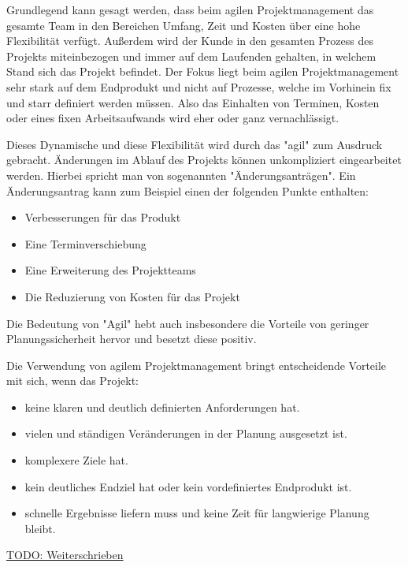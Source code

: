 

Grundlegend kann gesagt werden, dass beim agilen Projektmanagement das gesamte Team in den Bereichen Umfang, Zeit und Kosten über eine hohe Flexibilität verfügt. Außerdem wird der Kunde in den gesamten Prozess des Projekts miteinbezogen und immer auf dem Laufenden gehalten, in welchem Stand sich das Projekt befindet. Der Fokus liegt beim agilen Projektmanagement sehr stark auf dem Endprodukt und nicht auf Prozesse, welche im Vorhinein fix und starr definiert werden müssen. Also das Einhalten von Terminen, Kosten oder eines fixen Arbeitsaufwands wird eher oder ganz vernachlässigt. 

Dieses Dynamische und diese Flexibilität wird durch das "agil" zum Ausdruck gebracht. Änderungen im Ablauf des Projekts können unkompliziert eingearbeitet werden. Hierbei spricht man von sogenannten "Änderungsanträgen". Ein Änderungsantrag kann zum Beispiel einen der folgenden Punkte enthalten:

\begin{itemize}
    \item Verbesserungen für das Produkt
    \item Eine Terminverschiebung
    \item Eine Erweiterung des Projektteams
    \item Die Reduzierung von Kosten für das Projekt
\end{itemize}

Die Bedeutung von "Agil" hebt auch insbesondere die Vorteile von geringer Planungssicherheit hervor und besetzt diese positiv. \cite{agil} \cite{Aenderung}


Die Verwendung von agilem Projektmanagement bringt entscheidende Vorteile mit sich, wenn das Projekt:

\begin{itemize}
    \item keine klaren und deutlich definierten Anforderungen hat.
    \item vielen und ständigen Veränderungen in der Planung ausgesetzt ist.
    \item komplexere Ziele hat.
    \item kein deutliches Endziel hat oder kein vordefiniertes Endprodukt ist.
    \item schnelle Ergebnisse liefern muss und keine Zeit für langwierige Planung bleibt.
\end{itemize}

\cite{AnwendungAgil}


\underline{TODO: Weiterschrieben}
